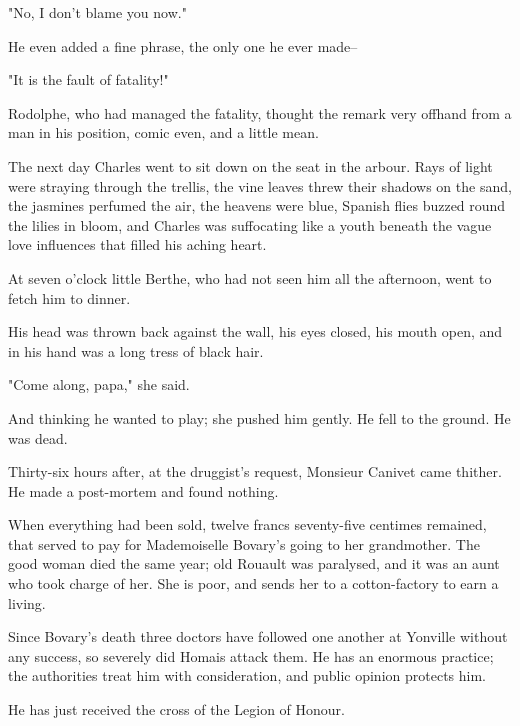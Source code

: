 \documentclass{tufte-book}
\begin{document}
"No, I don't blame you now."

He even added a fine phrase, the only one he ever made--

"It is the fault of fatality!"

Rodolphe, who had managed the fatality, thought the remark very offhand
from a man in his position, comic even, and a little mean.

The next day Charles went to sit down on the seat in the arbour. Rays
of light were straying through the trellis, the vine leaves threw their
shadows on the sand, the jasmines perfumed the air, the heavens were
blue, Spanish flies buzzed round the lilies in bloom, and Charles was
suffocating like a youth beneath the vague love influences that filled
his aching heart.

At seven o'clock little Berthe, who had not seen him all the afternoon,
went to fetch him to dinner.

His head was thrown back against the wall, his eyes closed, his mouth
open, and in his hand was a long tress of black hair.

"Come along, papa," she said.

And thinking he wanted to play; she pushed him gently. He fell to the
ground. He was dead.

Thirty-six hours after, at the druggist's request, Monsieur Canivet came
thither. He made a post-mortem and found nothing.

When everything had been sold, twelve francs seventy-five centimes
remained, that served to pay for Mademoiselle Bovary's going to
her grandmother. The good woman died the same year; old Rouault was
paralysed, and it was an aunt who took charge of her. She is poor, and
sends her to a cotton-factory to earn a living.

Since Bovary's death three doctors have followed one another at Yonville
without any success, so severely did Homais attack them. He has an
enormous practice; the authorities treat him with consideration, and
public opinion protects him.

He has just received the cross of the Legion of Honour.
\end{document}
